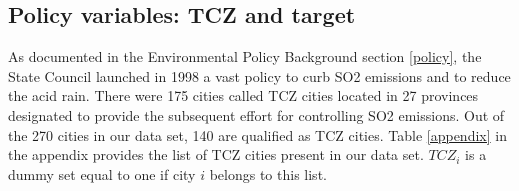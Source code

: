 \documentclass[12pt]{article}
\begin{document}
\subsection{Policy variables: TCZ and target}


As documented in the Environmental Policy Background section \ref{policy}, the State Council launched in 1998 a vast policy to curb SO2 emissions and to reduce the acid rain. There were 175 cities called TCZ cities located in 27 provinces designated to provide the subsequent effort for controlling SO2 emissions. Out of the 270 cities in our data set, 140 are qualified as TCZ cities. Table \ref{appendix} in the appendix provides the list of TCZ cities present in our data set. $TCZ_{i}$ is a dummy set equal to one if city $i$ belongs to this list. 
\end{document}
